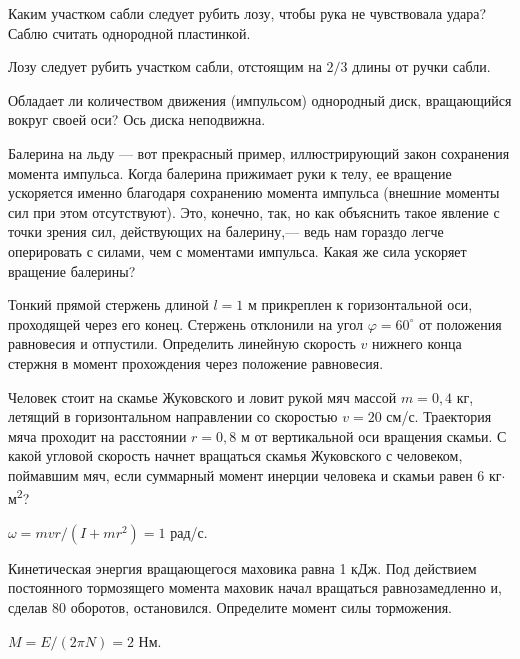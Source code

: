 \begin{ex}  %
Каким участком сабли следует рубить лозу, чтобы рука не чувствовала удара? Саблю считать однородной пластинкой.
\begin{ans}
Лозу следует рубить участком сабли, отстоящим на $2/3$ длины от ручки сабли.
\end{ans}
\end{ex}	

\qualProblems

\begin{ex}
Обладает ли количеством движения (импульсом) однородный диск, вращающийся вокруг своей оси? Ось диска неподвижна.
\end{ex}	

\begin{ex}
Балерина на льду — вот прекрасный пример, иллюстрирующий закон сохранения момента  импульса. Когда балерина прижимает руки к телу, ее вращение ускоряется именно благодаря сохранению момента импульса (внешние моменты сил при этом отсутствуют). Это, конечно, так, но как объяснить такое явление с точки зрения сил, действующих на балерину,— ведь нам гораздо легче оперировать с силами, чем с моментами импульса. Какая же сила ускоряет вращение балерины?
\end{ex}	

\simpleProblems

\begin{ex}
Тонкий прямой стержень длиной $l = 1$ м прикреплен к горизонтальной оси, проходящей через его конец. Стержень отклонили на угол $\varphi = 60^{\circ}$ от положения равновесия и отпустили. Определить линейную скорость $v$ нижнего конца стержня в момент прохождения через положение равновесия.
\end{ex}	

\begin{ex} %
Человек стоит на скамье Жуковского и ловит рукой мяч массой $m = 0,4$ кг, летящий в горизонтальном направлении со скоростью $v = 20$ см/с. Траектория мяча проходит на расстоянии $r=0,8$ м от вертикальной оси вращения скамьи. С какой угловой скорость начнет вращаться скамья Жуковского с человеком, поймавшим мяч, если суммарный момент инерции человека и скамьи равен 6 кг$\cdot$м\textsuperscript{2}?
\begin{ans}
$\omega = mvr/(I+mr^2) = 1$ рад/с.
\end{ans}
\end{ex}	

\begin{ex} %
Кинетическая энергия вращающегося маховика равна 1 кДж. Под действием постоянного тормозящего момента маховик начал вращаться равнозамедленно и, сделав 80 оборотов, остановился. Определите момент силы торможения.
\begin{ans}
$M = E / (2 \pi N) = 2$ Нм.
\end{ans}
\end{ex}	

